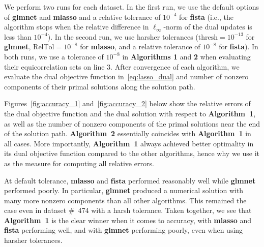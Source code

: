 \documentclass[11pt]{article}
\numberwithin{prop}{section}
\numberwithin{lem}{section}
\numberwithin{rem}{section}
\numberwithin{cor}{section}
\numberwithin{thm}{section}
\numberwithin{defn}{section}
\numberwithin{fact}{section}
\theoremstyle{plain}
\begin{document}
We perform two runs for each dataset. In the first run, we use the default options of \textbf{glmnet} and \textbf{mlasso} and a relative tolerance of $10^{-4}$ for \textbf{fista} (i.e., the algorithm stops when the relative difference in $\ell_{\infty}$-norm of the dual updates is less than $10^{-4}$). In the second run, we use harsher tolerances ($\text{thresh} = 10^{-13}$ for \textbf{glmnet}, $\text{RelTol} = 10^{-8}$ for \textbf{mlasso}, and a relative tolerance of $10^{-8}$ for \textbf{fista}). In both runs, we use a tolerance of $10^{-8}$ in \textbf{Algorithms 1} and \textbf{2} when evaluating their equicorrelation sets on line 3. After convergence of each algorithm, we evaluate the dual objective function in~\eqref{eq:lasso_dual} and number of nonzero components of their primal solutions along the solution path.


Figures~\ref{fig:accuracy_1} and~\ref{fig:accuracy_2} below show the relative errors of the dual objective function and the dual solution with respect to \textbf{Algorithm~1}, as well as the number of nonzero components of the primal solutions near the end of the solution path. \textbf{Algorithm~2} essentially coincides with \textbf{Algorithm~1} in all cases. More importantly, \textbf{Algorithm~1} always achieved better optimality in its dual objective function compared to the other algorithms, hence why we use it as the measure for computing all relative errors.


At default tolerance, \textbf{mlasso} and $\textbf{fista}$ performed reasonably well while \textbf{glmnet} performed poorly. In particular, \textbf{glmnet} produced a numerical solution with many more nonzero components than all other algorithms. This remained the case even in dataset \#~474 with a harsh tolerance. Taken together, we see that \textbf{Algorithm~1} is the clear winner when it comes to accuracy, with \textbf{mlasso} and \textbf{fista} performing well, and with \textbf{glmnet} performing poorly, even when using harsher tolerances.
\end{document}
